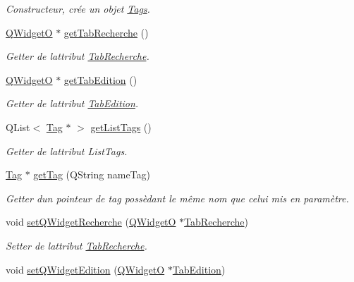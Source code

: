 \begin{DoxyCompactItemize}
\begin{DoxyCompactList}\small\item\em Constructeur, crée un objet \hyperlink{class_tags}{Tags}. \end{DoxyCompactList}\item 
\hyperlink{class_q_widget_o}{Q\+WidgetO} $\ast$ \hyperlink{class_tags_ac7b0c253bbea81ebec2f17fd628b67e2}{get\+Tab\+Recherche} ()
\begin{DoxyCompactList}\small\item\em Getter de l\textquotesingle{}attribut \hyperlink{class_tab_recherche}{Tab\+Recherche}. \end{DoxyCompactList}\item 
\hyperlink{class_q_widget_o}{Q\+WidgetO} $\ast$ \hyperlink{class_tags_aea3b5ed347a1eb66f41fc84d0d174d45}{get\+Tab\+Edition} ()
\begin{DoxyCompactList}\small\item\em Getter de l\textquotesingle{}attribut \hyperlink{class_tab_edition}{Tab\+Edition}. \end{DoxyCompactList}\item 
Q\+List$<$ \hyperlink{class_tag}{Tag} $\ast$ $>$ \hyperlink{class_tags_aab1b32558374b97adde959c3822d804d}{get\+List\+Tags} ()
\begin{DoxyCompactList}\small\item\em Getter de l\textquotesingle{}attribut List\+Tags. \end{DoxyCompactList}\item 
\hyperlink{class_tag}{Tag} $\ast$ \hyperlink{class_tags_a8068c802b3da7261d9b271fa566d6de7}{get\+Tag} (Q\+String name\+Tag)
\begin{DoxyCompactList}\small\item\em Getter d\textquotesingle{}un pointeur de tag possèdant le même nom que celui mis en paramètre. \end{DoxyCompactList}\item 
void \hyperlink{class_tags_a57abf29a5ab4a089a7d8e6b55c1f508f}{set\+Q\+Widget\+Recherche} (\hyperlink{class_q_widget_o}{Q\+WidgetO} $\ast$\hyperlink{class_tab_recherche}{Tab\+Recherche})
\begin{DoxyCompactList}\small\item\em Setter de l\textquotesingle{}attribut \hyperlink{class_tab_recherche}{Tab\+Recherche}. \end{DoxyCompactList}\item 
void \hyperlink{class_tags_a62d0a0430258dc94fb6aa41bd5558b19}{set\+Q\+Widget\+Edition} (\hyperlink{class_q_widget_o}{Q\+WidgetO} $\ast$\hyperlink{class_tab_edition}{Tab\+Edition})

\end{DoxyCompactItemize}

